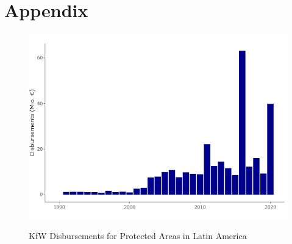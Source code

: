 \documentclass{article}
\begin{document}
\newpage
\section*{Appendix}
\begin{figure}[H]
\centering
\caption{KfW Disbursements for Protected Areas in Latin America}
\includegraphics[width=0.8\linewidth]{"figures/disbursements_kfw"}
\label{fig:disbursements}
\end{figure}
\end{document}
